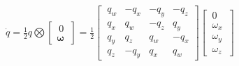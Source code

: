 \documentclass[preview]{standalone}
\begin{document}
\begin{center}
$\dot{q} = \frac{1}{2} q \bigotimes \begin{bmatrix}\
                    0 \\ \mathbf{\omega}\
                \end{bmatrix} = \frac{1}{2}\begin{bmatrix}\
                q_w & -q_x & -q_y & -q_z \\\
                q_x & q_w & -q_z & q_y \\\
                q_y & q_z & q_w & -q_x \\\
                q_z & -q_y & q_x & q_w\
            \end{bmatrix} \begin{bmatrix}\
                0 \\\
                \omega_x \\\
                \omega_y \\\
                \omega_z\
            \end{bmatrix}$
\end{center}
\end{document}
